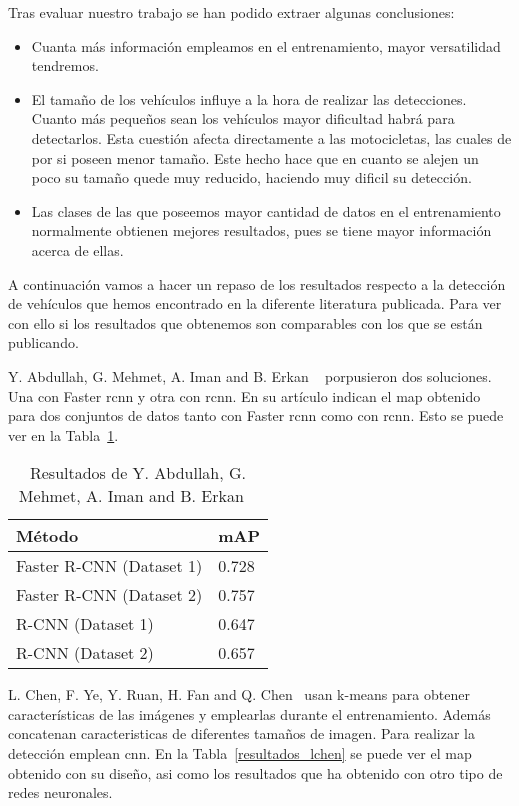 Tras evaluar nuestro trabajo se han podido extraer algunas conclusiones:
\begin{itemize}
    \item Cuanta más información empleamos en el entrenamiento, mayor versatilidad tendremos.
    \item El tamaño de los vehículos influye a la hora de realizar las detecciones. Cuanto más pequeños sean los vehículos mayor dificultad habrá para detectarlos. Esta cuestión afecta directamente a las motocicletas, las cuales de por si poseen menor tamaño. Este hecho hace que en cuanto se alejen un poco su tamaño quede muy reducido, haciendo muy dificil su detección.
    \item Las clases de las que poseemos mayor cantidad de datos en el entrenamiento normalmente obtienen mejores resultados, pues se tiene mayor información acerca de ellas.
\end{itemize}

A continuación vamos a hacer un repaso de los resultados respecto a la detección de vehículos que hemos encontrado en la diferente literatura publicada. Para ver con ello si los resultados que obtenemos son comparables con los que se están publicando.

Y. Abdullah, G. Mehmet, A. Iman and B. Erkan ~\cite{rcnn_detection} porpusieron dos soluciones. Una con Faster \acrshort{rcnn} y otra con \acrshort{rcnn}. En su artículo indican el \acrshort{map} obtenido para dos conjuntos de datos tanto con Faster \acrshort{rcnn} como con \acrshort{rcnn}. Esto se puede ver en la Tabla~\ref{resultados_abdullah}.

\begin{table}[htbp][H] 
\begin{center}
\begin{tabular}{|l|l|}
\hline
Método & mAP  \\ 
\hline \hline
Faster R-CNN (Dataset 1) & 0.728  \\ \hline
Faster R-CNN (Dataset 2)  & 0.757 \\ \hline
R-CNN (Dataset 1) & 0.647  \\ \hline
R-CNN (Dataset 2)  & 0.657 \\ \hline
\end{tabular}
\caption{Resultados de Y. Abdullah, G. Mehmet, A. Iman and B. Erkan ~\cite{rcnn_detection}}
\label{resultados_abdullah}
\end{center}
\end{table}

L. Chen, F. Ye, Y. Ruan, H. Fan and Q. Chen~\cite{l_chen} usan k-means para obtener características de las imágenes y emplearlas durante el entrenamiento. Además concatenan caracteristicas de diferentes tamaños de imagen. Para realizar la detección emplean \acrshort{cnn}. En la Tabla~\ref{resultados_lchen} se puede ver el \acrshort{map} obtenido con su diseño, asi como los resultados que ha obtenido con otro tipo de redes neuronales.

